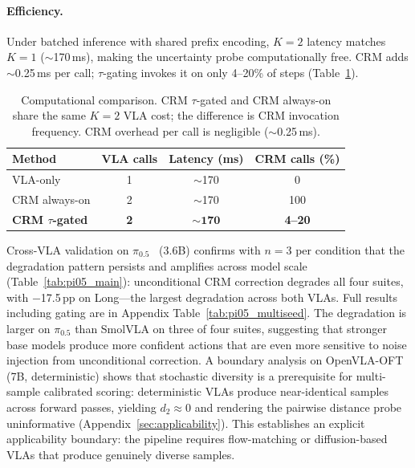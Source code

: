 \paragraph{Efficiency.}
Under batched inference with shared prefix encoding, $K{=}2$ latency matches $K{=}1$ (${\sim}$170\,ms), making the uncertainty probe computationally free. CRM adds ${\sim}$0.25\,ms per call; $\tau$-gating invokes it on only 4--20\% of steps (Table~\ref{tab:efficiency}).

\begin{table}[t]
\centering
\caption{Computational comparison. CRM $\tau$-gated and CRM always-on share the same $K{=}2$ VLA cost; the difference is CRM invocation frequency. CRM overhead per call is negligible (${\sim}$0.25\,ms).}
\label{tab:efficiency}
\small
\begin{tabular}{lccc}
\toprule
Method & VLA calls & Latency (ms) & CRM calls (\%) \\
\midrule
VLA-only & 1 & ${\sim}$170 & 0 \\
CRM always-on & 2 & ${\sim}$170 & 100 \\
\textbf{CRM $\tau$-gated} & \textbf{2} & $\mathbf{{\sim}170}$ & \textbf{4--20} \\
\bottomrule
\end{tabular}
\end{table}

Cross-VLA validation on $\pi_{0.5}$~\cite{black2025pi05} (3.6B) confirms with $n{=}3$ per condition that the degradation pattern persists and amplifies across model scale (Table~\ref{tab:pi05_main}): unconditional CRM correction degrades all four suites, with $-$17.5\,pp on Long---the largest degradation across both VLAs. Full results including gating are in Appendix Table~\ref{tab:pi05_multiseed}. The degradation is larger on $\pi_{0.5}$ than SmolVLA on three of four suites, suggesting that stronger base models produce more confident actions that are even more sensitive to noise injection from unconditional correction. A boundary analysis on OpenVLA-OFT~\cite{kim2024openvla} (7B, deterministic) shows that stochastic diversity is a prerequisite for multi-sample calibrated scoring: deterministic VLAs produce near-identical samples across forward passes, yielding $d_2 \approx 0$ and rendering the pairwise distance probe uninformative (Appendix~\ref{sec:applicability}). This establishes an explicit applicability boundary: the pipeline requires flow-matching or diffusion-based VLAs that produce genuinely diverse samples.


